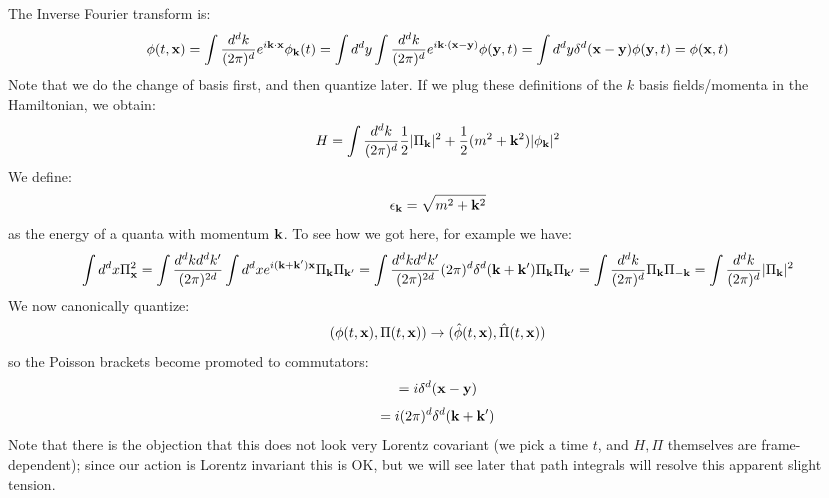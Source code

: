 The Inverse Fourier transform is:
\begin{equation}
    \phi(t, \mathbf{x}) = \int \frac{d^dk}{(2\pi)^d} e^{i\mathbf{k} \cdot \mathbf{x}} \phi_{\mathbf{k}}(t) = \int d^dy \int \frac{d^dk}{(2\pi)^d}e^{i\mathbf{k}\cdot (\mathbf{x} - \mathbf{y})}\phi(\mathbf{y}, t) = \int d^dy \delta^d(\mathbf{x} - \mathbf{y})\phi(\mathbf{y}, t) = \phi(\mathbf{x}, t)
\end{equation}
Note that we do the change of basis first, and then quantize later. If we plug these definitions of the $k$ basis fields/momenta in the Hamiltonian, we obtain:
\begin{equation}
    H = \int \frac{d^dk}{(2\pi)^d}\frac{1}{2}\lvert \Pi_{\mathbf{k}} \rvert^2 + \frac{1}{2}(m^2 + \mathbf{k}^2)\lvert \phi_{\mathbf{k}} \rvert^2
\end{equation}
We define:
\begin{equation}
    \epsilon_{\mathbf{k}} = \sqrt{m^2 + \mathbf{k}^2}
\end{equation}
as the energy of a quanta with momentum $\mathbf{k}$. To see how we got here, for example we have:
\begin{equation}
    \int d^d x \Pi_{\mathbf{x}}^2 = \int \frac{d^dkd^dk'}{(2\pi)^{2d}}\int d^dx e^{i(\mathbf{k} + \mathbf{k'})\mathbf{x}}\Pi_{\mathbf{k}}\Pi_{\mathbf{k}'}  = \int \frac{d^dkd^dk'}{(2\pi)^{2d}}(2\pi)^d\delta^d(\mathbf{k} + \mathbf{k}')\Pi_{\mathbf{k}}\Pi_{\mathbf{k}'} = \int \frac{d^dk}{(2\pi)^d}\Pi_{\mathbf{k}}\Pi_{-\mathbf{k}} = \int \frac{d^dk}{(2\pi)^d}\lvert \Pi_{\mathbf{k}} \rvert^2
\end{equation}
We now canonically quantize:
\begin{equation}
    (\phi(t, \mathbf{x}), \Pi(t, \mathbf{x})) \to (\hat{\phi}(t, \mathbf{x}), \hat{\Pi}(t, \mathbf{x}))
\end{equation}
so the Poisson brackets become promoted to commutators:
\begin{equation}
    [\hat{\phi}(t, \v{x}), \hat{\Pi}(t, \v{y})] = i\delta^d(\v{x} - \v{y})
\end{equation}
\begin{equation}
    [\hat{\phi}_\v{k}, \Pi_{\v{k}'}] = i(2\pi)^d \delta^d(\v{k} + \v{k}')
\end{equation}
Note that there is the objection that this does not look very Lorentz covariant (we pick a time $t$, and $H, \Pi$ themselves are frame-dependent); since our action is Lorentz invariant this is OK, but we will see later that path integrals will resolve this apparent slight tension.

